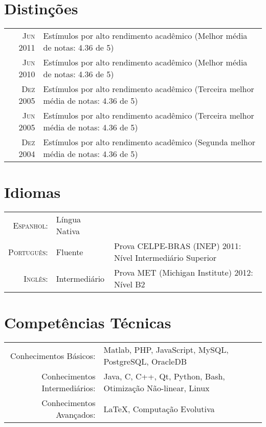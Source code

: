 \documentclass[a4paper,10pt]{article}
\begin{document}
\section{Distinções}
\begin{tabular}{rl}

  \textsc{Jun 2011} & Estímulos por alto rendimento acadêmico \footnotesize(Melhor média de notas: 4.36 de 5)\normalsize\\
  \textsc{Jun 2010} & Estímulos por alto rendimento acadêmico \footnotesize(Melhor média de notas: 4.36 de 5)\normalsize\\
  \textsc{Dez 2005} & Estímulos por alto rendimento acadêmico \footnotesize(Terceira melhor média de notas: 4.36 de 5)\normalsize\\
  \textsc{Jun 2005} & Estímulos por alto rendimento acadêmico \footnotesize(Terceira melhor média de notas: 4.36 de 5)\normalsize\\
  \textsc{Dez 2004} & Estímulos por alto rendimento acadêmico \footnotesize(Segunda melhor média de notas: 4.36 de 5)\normalsize\\

\end{tabular}

\section{Idiomas}
\begin{tabular}{rll}

  \textsc{Espanhol:}    & Língua Nativa     & \\
  \textsc{Português:}   & Fluente           & Prova \textsc{CELPE-BRAS} (INEP) 2011: Nível Intermediário Superior\\
  \textsc{Inglês:}      & Intermediário     & Prova \textsc{MET} (Michigan Institute) 2012: Nível B2 \\

\end{tabular}

\section{Competências Técnicas}
\begin{tabular}{rl}

  Conhecimentos Básicos:        & Matlab, PHP, JavaScript, MySQL, PostgreSQL, OracleDB \\
  Conhecimentos Intermediários: & Java, C, C++, Qt, Python, Bash, Otimização Não-linear, Linux\\
  Conhecimentos Avançados:      & \LaTeX, Computação Evolutiva 

\end{tabular}
\end{document}

